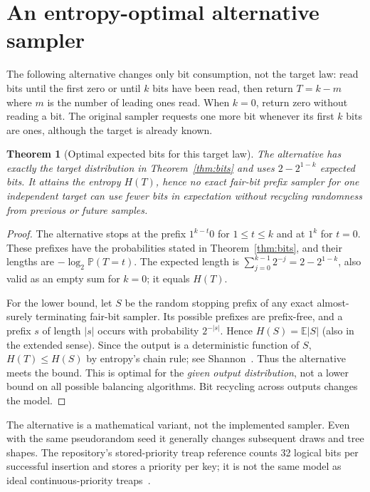 \documentclass[11pt]{article}
\newtheorem{theorem}{Theorem}
\newcommand{\E}{\mathbb{E}}
\newcommand{\Prb}{\mathbb{P}}
\begin{document}
\section{An entropy-optimal alternative sampler}
The following alternative changes only bit consumption, not the target law:
read bits until the first zero or until $k$ bits have been read, then return
$T=k-m$ where $m$ is the number of leading ones read. When $k=0$, return zero
without reading a bit. The original sampler requests one more bit whenever its
first $k$ bits are ones, although the target is already known.

\begin{theorem}[Optimal expected bits for this target law]\label{thm:entropy}
The alternative has exactly the target distribution in Theorem~\ref{thm:bits}
and uses $2-2^{1-k}$ expected bits. It attains the entropy $H(T)$, hence no
exact fair-bit prefix sampler for one independent target can use fewer bits in
expectation without recycling randomness from previous or future samples.
\end{theorem}
\begin{proof}
The alternative stops at the prefix $1^{k-t}0$ for $1\leq t\leq k$ and at
$1^k$ for $t=0$. These prefixes have the probabilities stated in
Theorem~\ref{thm:bits}, and their lengths are $-\log_2\Prb(T=t)$. The expected
length is $\sum_{j=0}^{k-1}2^{-j}=2-2^{1-k}$, also valid as an empty sum for
$k=0$; it equals $H(T)$.

For the lower bound, let $S$ be the random stopping prefix of any exact
almost-surely terminating fair-bit sampler. Its possible prefixes are
prefix-free, and a prefix $s$ of length $|s|$ occurs with probability
$2^{-|s|}$. Hence $H(S)=\E|S|$ (also in the extended sense). Since the output
is a deterministic function of $S$, $H(T)\leq H(S)$ by entropy's chain rule;
see Shannon~\cite{shannon}. Thus the alternative meets the bound. This is
optimal for the \emph{given output distribution}, not a lower bound on all
possible balancing algorithms. Bit recycling across outputs changes the model.
\end{proof}
The alternative is a mathematical variant, not the implemented sampler. Even
with the same pseudorandom seed it generally changes subsequent draws and tree
shapes. The repository's stored-priority treap reference counts 32 logical bits
per successful insertion and stores a priority per key; it is not the same model
as ideal continuous-priority treaps~\cite{aragon}.
\end{document}

